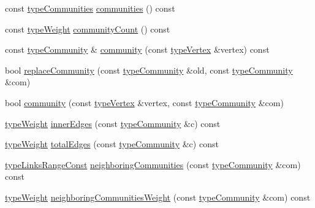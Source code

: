\begin{DoxyCompactItemize}
const \hyperlink{graphUndirectedGroupable_8h_ab79c7252155ca17cb49aa0b1fea30116}{type\+Communities} \hyperlink{classGraphUndirectedGroupable_a57f8ea4cff0d83b80cca2dc8e8e19ff6}{communities} () const
\item 
const \hyperlink{edge_8h_a2e7ea3be891ac8b52f749ec73fee6dd2}{type\+Weight} \hyperlink{classGraphUndirectedGroupable_adf6ebb83c3df6317f122a13650309ac4}{community\+Count} () const
\item 
const \hyperlink{graphUndirectedGroupable_8h_a914da95c9ea7f14f4b7f875c36818556}{type\+Community} \& \hyperlink{classGraphUndirectedGroupable_ad40474d566b3f9fbe9d132fbbe562ed5}{community} (const \hyperlink{edge_8h_a5fbd20c46956d479cb10afc9855223f6}{type\+Vertex} \&vertex) const
\item 
bool \hyperlink{classGraphUndirectedGroupable_af29e653d9578b955e47288e075ebf47f}{replace\+Community} (const \hyperlink{graphUndirectedGroupable_8h_a914da95c9ea7f14f4b7f875c36818556}{type\+Community} \&old, const \hyperlink{graphUndirectedGroupable_8h_a914da95c9ea7f14f4b7f875c36818556}{type\+Community} \&com)
\item 
bool \hyperlink{classGraphUndirectedGroupable_a7a9642a50ac522d9020afb9df211702f}{community} (const \hyperlink{edge_8h_a5fbd20c46956d479cb10afc9855223f6}{type\+Vertex} \&vertex, const \hyperlink{graphUndirectedGroupable_8h_a914da95c9ea7f14f4b7f875c36818556}{type\+Community} \&com)
\item 
\hyperlink{edge_8h_a2e7ea3be891ac8b52f749ec73fee6dd2}{type\+Weight} \hyperlink{classGraphUndirectedGroupable_a1986c140fd9aba8063774372c971706d}{inner\+Edges} (const \hyperlink{graphUndirectedGroupable_8h_a914da95c9ea7f14f4b7f875c36818556}{type\+Community} \&c) const
\item 
\hyperlink{edge_8h_a2e7ea3be891ac8b52f749ec73fee6dd2}{type\+Weight} \hyperlink{classGraphUndirectedGroupable_a8aa795a6e0ae115d35937508c5aad401}{total\+Edges} (const \hyperlink{graphUndirectedGroupable_8h_a914da95c9ea7f14f4b7f875c36818556}{type\+Community} \&c) const
\item 
\hyperlink{graphInterface_8h_ae8d27008f15586bbf419af7ad2e0a48a}{type\+Links\+Range\+Const} \hyperlink{classGraphUndirectedGroupable_a248d992baca0755467a2eaea96fe3654}{neighboring\+Communities} (const \hyperlink{graphUndirectedGroupable_8h_a914da95c9ea7f14f4b7f875c36818556}{type\+Community} \&com) const
\item 
\hyperlink{edge_8h_a2e7ea3be891ac8b52f749ec73fee6dd2}{type\+Weight} \hyperlink{classGraphUndirectedGroupable_a29f2ad12ef73c9f0febea63c43b1619b}{neighboring\+Communities\+Weight} (const \hyperlink{graphUndirectedGroupable_8h_a914da95c9ea7f14f4b7f875c36818556}{type\+Community} \&com) const

\end{DoxyCompactItemize}
